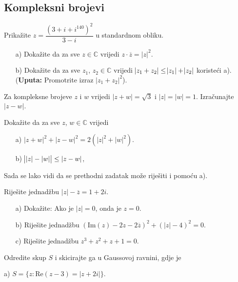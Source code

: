 \begin{exercise}
\subsection*{Kompleksni brojevi}
\begin{exercise}
Prikažite $z=\dfrac{(3+i+i^{140})^2}{3-i}$ u standardnom obliku.
\end{exercise}
\begin{exercise}\textbf{}
\begin{itemize}
\item[a)] Dokažite da za sve $z\in \mathbb{C}$ vrijedi $z\cdot \overline{z}=|z|^2$.
\item[b)] Dokažite da za sve $z_1$, $z_2\in \mathbb{C}$ vrijedi $\abs{z_1+z_2}\leq \abs{z_1}+\abs{z_2}$ koristeći a). (\textbf{Uputa:} Promotrite izraz $|z_1+z_2|^2$).
\end{itemize}
\end{exercise}
\begin{exercise}
Za kompleksne brojeve $z$ i $w$ vrijedi $|z+w|=\sqrt{3}$ i $|z|=|w|=1$. Izračunajte $|z-w|$.
\end{exercise}
\begin{exercise}
Dokažite da za sve $z$, $w\in \mathbb{C}$ vrijedi
\begin{itemize}
\item[a)] $|z+w|^2+|z-w|^2=2\left(|z|^2+|w|^2\right)$.
\item[b)] $\abs{|z|-|w|}\leq |z-w|$,
\end{itemize}
Sada se lako vidi da se prethodni zadatak može riješiti i pomoću a).
\end{exercise}
\begin{exercise}
Riješite jednadžbu $|z|-\overline{z}=1+2i$.
\end{exercise}
\begin{exercise}\textbf{}
\begin{itemize}
\item[a)] Dokažite: Ako je $|z|=0$, onda je $z=0$.
\item[b)] Riješite jednadžbu $\left(\mathrm{Im}(z)-2z-2\overline{z}\right)^2+\left(|z|-4\right)^2=0$.
\item[c)] Riješite jednadžbu $z^3+z^2+z+1=0$.
\end{itemize}
\end{exercise}
\begin{exercise}
Odredite skup $S$ i skicirajte ga u Gaussovoj ravnini, gdje je
\begin{AutoMultiColItemize}
\item[a)] $S=\{z : \mathrm{Re}(z-3)=|z+2i|\}$.

\end{AutoMultiColItemize}
\end{exercise}
\end{exercise}
